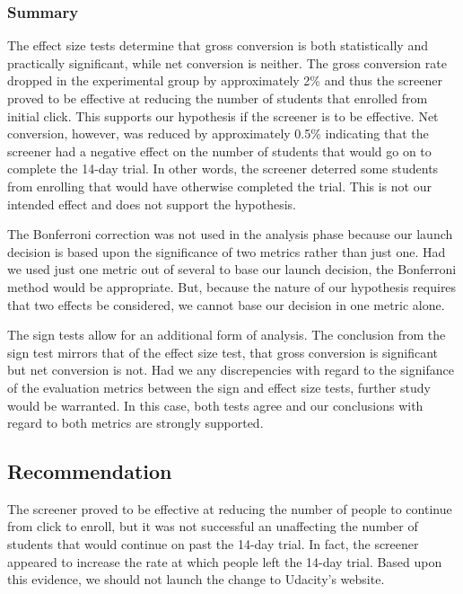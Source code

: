 \documentclass[paper=a4, fontsize=11pt]{scrartcl} %
\numberwithin{equation}{section} %
\numberwithin{figure}{section} %
\numberwithin{table}{section} %
\begin{document}

\subsubsection{Summary}

The effect size tests determine that gross conversion is both statistically and practically significant, while net conversion is neither.   The gross conversion rate dropped in the experimental group by approximately 2\% and thus the screener proved to be effective at reducing the number of students that enrolled from initial click.  This supports our hypothesis if the screener is to be effective.  Net conversion, however, was reduced by approximately 0.5\% indicating that the screener had a negative effect on the number of students that would go on to complete the 14-day trial.  In other words, the screener deterred some students from enrolling that would have otherwise completed the trial.  This is not our intended effect and does not support the hypothesis.  \newline

The Bonferroni correction was not used in the analysis phase because our launch decision is based upon the significance of two metrics rather than just one.  Had we used just one metric out of several to base our launch decision, the Bonferroni method would be appropriate.  But, because the nature of our hypothesis requires that two effects be considered, we cannot base our decision in one metric alone. \newline

The sign tests allow for an additional form of analysis.  The conclusion from the sign test mirrors that of the effect size test, that gross conversion is significant but net conversion is not.  Had we any discrepencies with regard to the signifance of the evaluation metrics between the sign and effect size tests, further study would be warranted.  In this case, both tests agree and our conclusions with regard to both metrics are strongly supported.


\subsection{Recommendation}

The screener proved to be effective at reducing the number of people to continue from click to enroll, but it was not successful an unaffecting the number of students that would continue on past the 14-day trial.  In fact, the screener appeared to increase the rate at which people left the 14-day trial.  Based upon this evidence, we should not launch the change to Udacity's website. \newline
\end{document}
